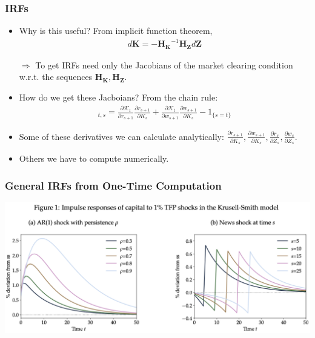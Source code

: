 \documentclass[english,xcolor=svgnames]{beamer}
\begin{document}
\begin{frame}
    \frametitle{IRFs}
    \begin{itemize}
        \item Why is this useful? From implicit function theorem,
        \begin{align*}
        	d\bm{K} = - \bm{H_{K}}^{-1}\bm{H_Z} d\bm{Z}
        \end{align*}
        \item[$\Rightarrow$] To get IRFs need only the Jacobians of the market clearing condition w.r.t. the sequences $\bm{H_{K}},\bm{H_Z}$.
        \item How do we get these Jacboians? From the chain rule:
        \begin{align*}
        	[\bm{H_{K}}]_{t,s} = \frac{\partial \mathcal{K}_t}{\partial r_{s+1}}\frac{\partial r_{s+1}}{\partial K_s} + \frac{\partial \mathcal{K}_t}{\partial w_{s+1}}\frac{\partial w_{s+1}}{\partial K_s} - 1_{\{s=t\}}
        \end{align*}
        \item Some of these derivatives we can calculate analytically: $\frac{\partial r_{s+1}}{\partial K_s}, \frac{\partial w_{s+1}}{\partial K_s}, \frac{\partial r_{s}}{\partial Z_s}, \frac{\partial w_{s}}{\partial Z_s}$. 
        \item Others we have to compute numerically.
	\end{itemize}
\end{frame}


\begin{frame}
    \frametitle{General IRFs from One-Time Computation}
    \includegraphics[scale=0.5]{figures/ABRSFIG1.png}
\end{frame}
\end{document}
